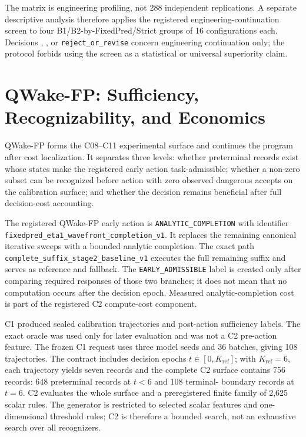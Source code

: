 The matrix is engineering profiling, not 288 independent replications. A separate
descriptive analysis therefore applies the registered engineering-continuation screen
to four B1/B2-by-FixedPred/Strict groups of 16 configurations each. Decisions
, , or \texttt{reject\_or\_revise} concern engineering
continuation only; the protocol forbids using the screen as a statistical or universal
superiority claim.

\section{QWake-FP: Sufficiency, Recognizability, and Economics}
\label{sec:qwake-experiment-en}

QWake-FP forms the C08--C11 experimental surface and continues the program after cost
localization. It separates three levels: whether preterminal records exist whose states
make the registered early action task-admissible; whether a non-zero subset can be
recognized before action with zero observed dangerous accepts on the calibration
surface; and whether the decision remains beneficial after full decision-cost
accounting.

The registered QWake-FP early action is \texttt{ANALYTIC\_COMPLETION} with identifier
\nolinkurl{fixedpred_eta1_wavefront_completion_v1}. It replaces the remaining
canonical iterative sweeps with a bounded analytic completion. The exact path
\nolinkurl{complete_suffix_stage2_baseline_v1} executes the full remaining suffix and
serves as reference and fallback. The \texttt{EARLY\_ADMISSIBLE} label is created only
after comparing required responses of those two branches; it does not mean that no
computation occurs after the decision epoch. Measured analytic-completion cost is part
of the registered C2 compute-cost component.

C1 produced sealed calibration trajectories and post-action sufficiency labels. The
exact oracle was used only for later evaluation and was not a C2 pre-action feature.
The frozen C1 request uses three model seeds and 36 batches, giving 108 trajectories.
The contract includes decision epochs \(t\in[0,K_{\mathrm{ref}}]\); with
\(K_{\mathrm{ref}}=6\), each trajectory yields seven records and the complete C2
surface contains 756 records: 648 preterminal records at \(t<6\) and 108 terminal-
boundary records at \(t=6\). C2 evaluates the whole surface and a preregistered finite
family of 2,625 scalar rules. The generator is restricted to selected scalar features
and one-dimensional threshold rules; C2 is therefore a bounded search, not an
exhaustive search over all recognizers.

